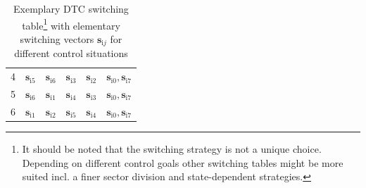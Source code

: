 \begin{frame}
\begin{table}[htbp]
\begin{tabular}{c c c c c c}
            4 & $\bm{s}_{\mathrm{i}5}$ & $\bm{s}_{\mathrm{i}6}$ & $\bm{s}_{\mathrm{i}3}$ & $\bm{s}_{\mathrm{i}2}$ & $\bm{s}_{\mathrm{i}0}, \bm{s}_{\mathrm{i}7}$ \\
            5 & $\bm{s}_{\mathrm{i}6}$ & $\bm{s}_{\mathrm{i}1}$ & $\bm{s}_{\mathrm{i}4}$ & $\bm{s}_{\mathrm{i}3}$ & $\bm{s}_{\mathrm{i}0}, \bm{s}_{\mathrm{i}7}$ \\
            6 & $\bm{s}_{\mathrm{i}1}$ & $\bm{s}_{\mathrm{i}2}$ & $\bm{s}_{\mathrm{i}5}$ & $\bm{s}_{\mathrm{i}4}$ & $\bm{s}_{\mathrm{i}0}, \bm{s}_{\mathrm{i}7}$ \\
            \bottomrule
        \end{tabular}
        \caption{Exemplary DTC switching table\footnote{It should be noted that the switching strategy is not a unique choice. Depending on different control goals other switching tables might be more suited incl. a finer sector division and state-dependent strategies.} with elementary switching vectors $\bm{s}_{\mathrm{i}j}$ for different control situations}
        \label{tab:DTC_switching_table}
    \end{table}
\end{frame}


